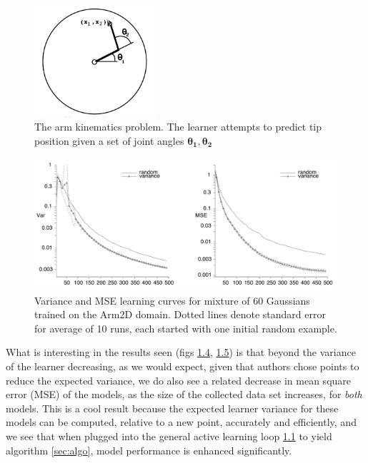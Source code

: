 \documentclass[
  letterpaper,
  DIV=11,
  numbers=noendperiod,
  oneside]{scrreprt}
\theoremstyle{remark}
\begin{document}
\begin{figure}

{\centering \includegraphics[width=0.4\textwidth,height=\textheight]{Figures/1_experiment_setup.png}

}

\caption{The arm kinematics problem. The learner attempts to predict tip
position given a set of joint angles
\(\mathbf{\theta_1}, \mathbf{\theta_2}\)}

\end{figure}%
\begin{figure}

{\centering \includegraphics[width=1\textwidth,height=\textheight]{Figures/1_experiment_results_gaussian.png}

}

\caption{Variance and MSE learning curves for mixture of 60 Gaussians
trained on the Arm2D domain. Dotted lines denote standard error for
average of 10 runs, each started with one initial random example.}

\end{figure}%

What is interesting in the results seen (figs
\hyperref[fig:empirical:gauss]{1.4},
\hyperref[fig:empirical:regress]{1.5}) is that beyond the variance of
the learner decreasing, as we would expect, given that authors chose
points to reduce the expected variance, we do also see a related
decrease in mean square error (MSE) of the models, as the size of the
collected data set increases, for \emph{both} models. This is a cool
result because the expected learner variance for these models can be
computed, relative to a new point, accurately and efficiently, and we
see that when plugged into the general active learning loop
\hyperref[fig:schema]{1.1} to yield algorithm
\hyperref[sec:algo]{{[}sec:algo{]}}, model performance is enhanced
significantly.
\end{document}
